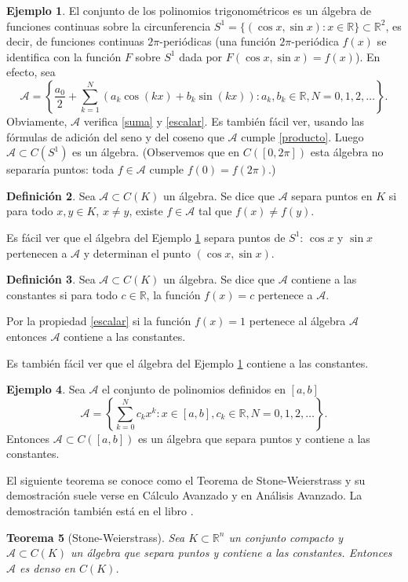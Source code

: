 \documentclass[12pt, a4paper]{amsbook}
\newcommand{\R}{{\mathbb R}}
\newcommand{\A}{{\mathcal A}}
\newtheorem{teo}{Teorema}[section]
\theoremstyle{remark}
\theoremstyle{definition}
\newtheorem{defi}[teo]{Definici\'on}
\newtheorem{ejem}[teo]{Ejemplo}
\numberwithin{section}{chapter}
\numberwithin{subsection}{section}
\numberwithin{equation}{section}
\numberwithin{figure}{chapter}
\begin{document}
\begin{ejem}\label{ej.fourier}
El conjunto de los polinomios trigonométricos es un álgebra de funciones continuas sobre la circunferencia $S^1=\{(\cos x,\sin x)\colon x\in\R\}\subset\R^2$, es decir, de funciones continuas $2\pi$-periódicas (una función $2\pi$-periódica $f(x)$ se identifica con la función $F$ sobre $S^1$ dada por $F(\cos x,\sin x)=f(x)$). En efecto, sea
$$
\A = \left\{\frac{a_0}{2} + \sum_{k=1}^N (a_k\cos(kx) + b_k\sin(kx))\colon a_k, b_k\in \R, N=0,1,2,\dots\right\}.
$$
Obviamente, $\A$ verifica \ref{suma} y \ref{escalar}. Es también fácil ver, usando las fórmulas de adición del seno y del coseno que $\A$ cumple \ref{producto}. Luego $\A\subset C(S^1)$ es un álgebra. (Observemos que en $C([0,2\pi])$ esta álgebra no separaría puntos: toda $f\in\A$ cumple $f(0)=f(2\pi)$.)
\end{ejem}

\begin{defi}
Sea $\A\subset C(K)$ un álgebra. Se dice que $\A$ separa puntos en $K$ si para todo $x, y\in K$, $x\neq y$, existe $f\in\A$ tal que $f(x)\neq f(y)$.
\end{defi}

Es fácil ver que el álgebra del Ejemplo \ref{ej.fourier} separa puntos de $S^1$: $\cos x$ y $\sin x$ pertenecen a $\A$ y determinan el punto $(\cos x,\sin x)$.

\begin{defi}
Sea $\A\subset C(K)$ un álgebra. Se dice que $\A$ contiene a las constantes si para todo $c\in \R$, la función $f(x)=c$ pertenece a $\A$.
\end{defi}

Por la propiedad \ref{escalar} si la función $f(x)=1$ pertenece al álgebra $\A$ entonces $\A$ contiene a las constantes.

Es también fácil ver que el álgebra del Ejemplo \ref{ej.fourier} contiene a las constantes.

\begin{ejem}
Sea $\A$ el conjunto de polinomios definidos en $[a, b]$
$$
\A = \left\{ \sum_{k=0}^N c_k x^k\colon x\in [a, b], c_k\in\R, N=0,1,2,\dots\right\}.
$$
Entonces $\A\subset C([a, b])$ es un álgebra que separa puntos y contiene a las constantes.
\end{ejem}

El siguiente teorema se conoce como el Teorema de Stone-Weierstrass y su demostración suele verse en Cálculo Avanzado y en Análisis Avanzado. La demostración también está en el libro \cite{Royden}.
\begin{teo}[Stone-Weierstrass]
Sea $K\subset \R^n$ un conjunto compacto y $\A\subset C(K)$ un álgebra que separa puntos y contiene a las constantes. Entonces $\A$ es denso en $C(K)$.
\end{teo}
\end{document}
